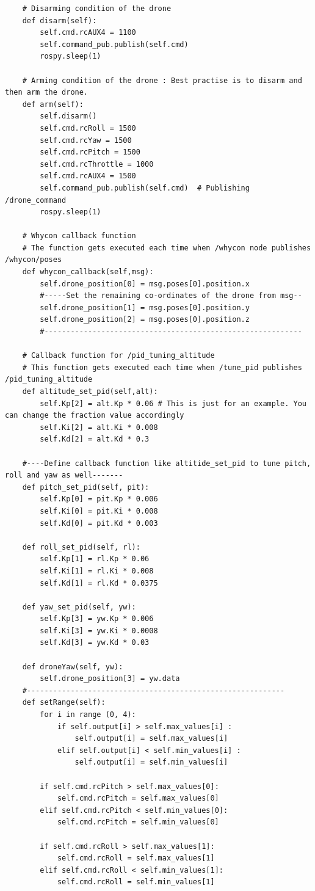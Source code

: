 \begin{verbatim}
	# Disarming condition of the drone
	def disarm(self):
		self.cmd.rcAUX4 = 1100
		self.command_pub.publish(self.cmd)
		rospy.sleep(1)

	# Arming condition of the drone : Best practise is to disarm and then arm the drone.
	def arm(self):
		self.disarm()
		self.cmd.rcRoll = 1500
		self.cmd.rcYaw = 1500
		self.cmd.rcPitch = 1500
		self.cmd.rcThrottle = 1000
		self.cmd.rcAUX4 = 1500
		self.command_pub.publish(self.cmd)	# Publishing /drone_command
		rospy.sleep(1)

	# Whycon callback function
	# The function gets executed each time when /whycon node publishes /whycon/poses 
	def whycon_callback(self,msg):
		self.drone_position[0] = msg.poses[0].position.x
		#-----Set the remaining co-ordinates of the drone from msg--
		self.drone_position[1] = msg.poses[0].position.y
		self.drone_position[2] = msg.poses[0].position.z
		#-----------------------------------------------------------

	# Callback function for /pid_tuning_altitude
	# This function gets executed each time when /tune_pid publishes /pid_tuning_altitude
	def altitude_set_pid(self,alt):
		self.Kp[2] = alt.Kp * 0.06 # This is just for an example. You can change the fraction value accordingly
		self.Ki[2] = alt.Ki * 0.008
		self.Kd[2] = alt.Kd * 0.3
	
	#----Define callback function like altitide_set_pid to tune pitch, roll and yaw as well-------
	def pitch_set_pid(self, pit):
		self.Kp[0] = pit.Kp * 0.006
		self.Ki[0] = pit.Ki * 0.008
		self.Kd[0] = pit.Kd * 0.003

	def roll_set_pid(self, rl):
		self.Kp[1] = rl.Kp * 0.06
		self.Ki[1] = rl.Ki * 0.008
		self.Kd[1] = rl.Kd * 0.0375

	def yaw_set_pid(self, yw):
		self.Kp[3] = yw.Kp * 0.006 
		self.Ki[3] = yw.Ki * 0.0008
		self.Kd[3] = yw.Kd * 0.03

	def droneYaw(self, yw):
		self.drone_position[3] = yw.data
	#-----------------------------------------------------------
	def setRange(self):
		for i in range (0, 4):
			if self.output[i] > self.max_values[i] :
				self.output[i] = self.max_values[i]
			elif self.output[i] < self.min_values[i] :
				self.output[i] = self.min_values[i]

		if self.cmd.rcPitch > self.max_values[0]:
		 	self.cmd.rcPitch = self.max_values[0]
		elif self.cmd.rcPitch < self.min_values[0]:
		 	self.cmd.rcPitch = self.min_values[0]

		if self.cmd.rcRoll > self.max_values[1]:
		 	self.cmd.rcRoll = self.max_values[1]
		elif self.cmd.rcRoll < self.min_values[1]:
		 	self.cmd.rcRoll = self.min_values[1]


\end{verbatim}
